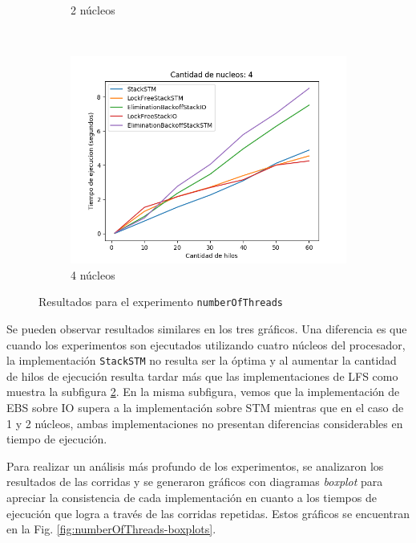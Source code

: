 \begin{figure}[H]
\begin{subfigure}[b]{0.49\textwidth}
        \caption{2 núcleos}
        \label{subfig:numberOfThreads-2core}
    \end{subfigure}
    ~
    \begin{subfigure}[b]{0.5\textwidth}
        \includegraphics[width=\textwidth]{images/numberOfThreads/plots/4.png}
        \caption{4 núcleos}
        \label{subfig:numberOfThreads-4core}
    \end{subfigure}
    \caption{Resultados para el experimento \texttt{numberOfThreads}}
    \label{fig:numberOfThreads-all}
\end{figure}

Se pueden observar resultados similares en los tres gráficos. Una diferencia es que cuando los experimentos son ejecutados utilizando cuatro núcleos del procesador, la implementación \texttt{StackSTM} no resulta ser la óptima y al aumentar la cantidad de hilos de ejecución resulta tardar más que las implementaciones de LFS como muestra la subfigura \ref{subfig:numberOfThreads-4core}.
En la misma subfigura, vemos que la implementación de EBS sobre IO supera a la implementación sobre STM mientras que en el caso de 1 y 2 núcleos, ambas implementaciones no presentan diferencias considerables en tiempo de ejecución.

Para realizar un análisis más profundo de los experimentos, se analizaron los resultados de las corridas y se generaron gráficos con diagramas \emph{boxplot} para apreciar la consistencia de cada implementación en cuanto a los tiempos de ejecución que logra a través de las corridas repetidas. Estos gráficos se encuentran en la Fig. \ref{fig:numberOfThreads-boxplots}.


